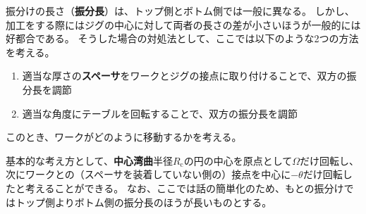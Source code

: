 


振分けの長さ（\textbf{振分長}）は、トップ側とボトム側では一般に異なる。
しかし、加工をする際にはジグの中心に対して両者の長さの差が小さいほうが一般的には好都合である。
そうした場合の対処法として、ここでは以下のような2つの方法を考える。
\begin{enumerate}
\item
適当な厚さの\textbf{スペーサ}をワークとジグの接点に取り付けることで、双方の振分長を調節
\item
適当な角度にテーブルを回転することで、双方の振分長を調節
\end{enumerate}
このとき、ワークがどのように移動するかを考える。

基本的な考え方として、\textbf{中心湾曲}半径$R_\mathrm c$の円の中心を原点として$\Omega$だけ回転し、次にワークとの（スペーサを装着していない側の）接点を中心に$-\theta$だけ回転したと考えることができる。
なお、ここでは話の簡単化のため、もとの振分けではトップ側よりボトム側の振分長のほうが長いものとする。




